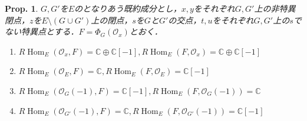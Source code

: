 \documentclass[uplatex,a4paper,11pt,dvipdfmx]{jsarticle}
\theoremstyle{mystyle} %
\newtheorem{proposition}[theorem]{Prop.}
\DeclareMathOperator{\Hom}{Hom}
\begin{document}
\begin{proposition}
	$G, G'$を$E$のとなりあう既約成分とし，$x,y$をそれぞれ$G, G'$上の非特異閉点，$z$を$E \setminus (G \cup G')$上の閉点，$s$を$G$と$G'$の交点，$t, u$をそれぞれ$G, G'$上の$s$でない特異点とする．$F = \Phi_G(\mathcal{O}_x)$とおく．
	\begin{enumerate}
		\item $R\Hom_E(\mathcal{O}_x, F) = \mathbb{C} \oplus \mathbb{C}[-1],R\Hom_E(F, \mathcal{O}_x) = \mathbb{C} \oplus \mathbb{C}[-1]$
		\item $R\Hom_E(\mathcal{O}_E, F) = \mathbb{C} ,R\Hom_E(F, \mathcal{O}_E) = \mathbb{C}[-1]$
		\item $R\Hom_E(\mathcal{O}_G(-1), F) = \mathbb{C}[-1] ,R\Hom_E(F, \mathcal{O}_G(-1)) = \mathbb{C}$
		\item $R\Hom_E(\mathcal{O}_{G'}(-1), F) = \mathbb{C} ,R\Hom_E(F, \mathcal{O}_{G'}(-1)) = \mathbb{C}[-1]$
	\end{enumerate}
\end{proposition}
\end{document}
